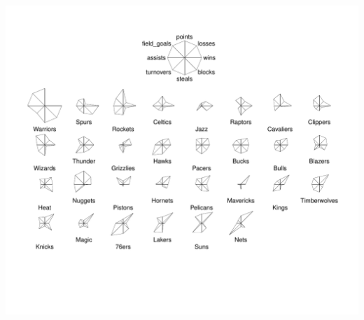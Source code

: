 \documentclass[12pt]{beamer}\usepackage[]{graphicx}\usepackage[]{color}
\newenvironment{knitrout}{}{} %
\begin{document}
\begin{frame}[fragile]

\begin{knitrout}\footnotesize
{}\color{fgcolor}

{\centering \includegraphics[width=.95\linewidth,height=.9\linewidth]{figure/stars-1} 

}



\end{knitrout}

\end{frame}

\end{document}
